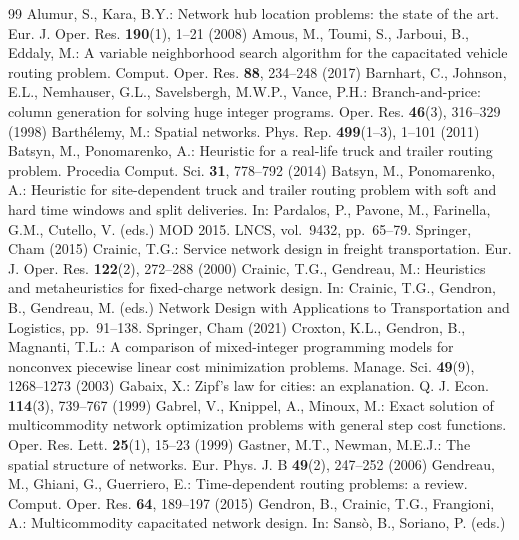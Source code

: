 \documentclass[runningheads]{llncs}
\begin{document}
\FloatBarrier
\begin{thebibliography}{99}
\small
{} Alumur, S., Kara, B.Y.: Network hub location problems: the
state of the art. Eur. J. Oper. Res. \textbf{190}(1), 1--21 (2008)
 Amous, M., Toumi, S., Jarboui, B., Eddaly, M.: A variable
neighborhood search algorithm for the capacitated vehicle routing problem.
Comput. Oper. Res. \textbf{88}, 234--248 (2017)
 Barnhart, C., Johnson, E.L., Nemhauser, G.L.,
Savelsbergh, M.W.P., Vance, P.H.: Branch-and-price: column generation for
solving huge integer programs. Oper. Res. \textbf{46}(3), 316--329 (1998)
 Barth\'elemy, M.: Spatial networks. Phys. Rep.
\textbf{499}(1--3), 1--101 (2011)
 Batsyn, M., Ponomarenko, A.: Heuristic for a real-life
truck and trailer routing problem. Procedia Comput. Sci. \textbf{31}, 778--792
(2014)
 Batsyn, M., Ponomarenko, A.: Heuristic for
site-dependent truck and trailer routing problem with soft and hard time windows
and split deliveries. In: Pardalos, P., Pavone, M., Farinella, G.M., Cutello, V.
(eds.) MOD 2015. LNCS, vol.~9432, pp.~65--79. Springer, Cham (2015)
 Crainic, T.G.: Service network design in freight
transportation. Eur. J. Oper. Res. \textbf{122}(2), 272--288 (2000)
 Crainic, T.G., Gendreau, M.: Heuristics and metaheuristics
for fixed-charge network design. In: Crainic, T.G., Gendron, B., Gendreau, M.
(eds.) Network Design with Applications to Transportation and Logistics,
pp.~91--138. Springer, Cham (2021)
 Croxton, K.L., Gendron, B., Magnanti, T.L.: A comparison
of mixed-integer programming models for nonconvex piecewise linear cost
minimization problems. Manage. Sci. \textbf{49}(9), 1268--1273 (2003)
 Gabaix, X.: Zipf's law for cities: an explanation. Q. J.
Econ. \textbf{114}(3), 739--767 (1999)
 Gabrel, V., Knippel, A., Minoux, M.: Exact solution of
multicommodity network optimization problems with general step cost functions.
Oper. Res. Lett. \textbf{25}(1), 15--23 (1999)
 Gastner, M.T., Newman, M.E.J.: The spatial structure of
networks. Eur. Phys. J. B \textbf{49}(2), 247--252 (2006)
 Gendreau, M., Ghiani, G., Guerriero, E.:
Time-dependent routing problems: a review. Comput. Oper. Res. \textbf{64},
189--197 (2015)
 Gendron, B., Crainic, T.G., Frangioni, A.: Multicommodity
capacitated network design. In: Sans\`o, B., Soriano, P. (eds.)

\end{thebibliography}
\end{document}
